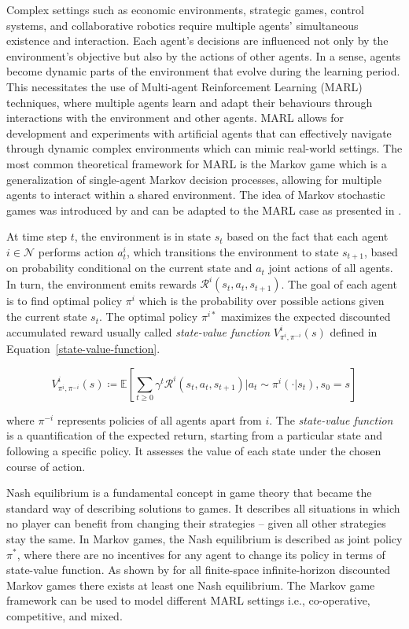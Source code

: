 \documentclass[pdflatex,sn-basic,lineno]{sn-jnl}
\theoremstyle{thmstyleone}%
\theoremstyle{thmstyletwo}%
\theoremstyle{thmstylethree}%
\begin{document}
Complex settings such as economic environments, strategic games, control systems, and collaborative robotics require
multiple agents’ simultaneous existence and interaction. Each agent’s decisions are influenced not only by the
environment’s objective but also by the actions of other agents. In a sense, agents become dynamic parts of the
environment that evolve during the learning period. This necessitates the use of Multi-agent Reinforcement Learning
(MARL) techniques, where multiple agents learn and adapt their behaviours through interactions with the environment and
other agents. MARL allows for development and experiments with artificial agents that can effectively navigate through
dynamic complex environments which can mimic real-world settings. The most common theoretical framework for MARL is the
Markov game which is a generalization of single-agent Markov decision processes, allowing for multiple agents to
interact within a shared environment. The idea of Markov stochastic games was introduced by \cite{Shapley1953} and can
be adapted to the MARL case as presented in \cite{Zhang2021}.


At time step $t$, the environment is in state $s_t$ based on the fact that each agent $i\in\mathcal{N}$ performs action
$a^i_t$, which transitions the environment to state $s_{t+1}$, based on probability conditional on the current state and
$a_t$ joint actions of all agents. In turn, the environment emits rewards $\mathcal{R}^i(s_t,a_t,s_{t+1})$. The goal of
each agent is to find optimal policy $\pi^i$ which is the probability over possible actions given the current state
$s_t$. The optimal policy $\pi^{i*}$ maximizes the expected discounted accumulated reward usually called
\textit{state-value function} $V^i_{\pi^i,\pi^{-i}}(s)$ defined in Equation~\ref{state-value-function}.

\begin{equation}\label{state-value-function}
    V^i_{\pi^i,\pi^{-i}}(s)\coloneqq\mathbb{E}\left[\sum\limits_{t\geq0}\gamma^t\mathcal{R}^i(s_t,a_t,s_{t+1})\bigg| a_t\sim \pi^i(\cdot|s_t),s_0=s\right]
\end{equation}

where $\pi^{-i}$ represents policies of all agents apart from $i$. The \textit{state-value function} is a quantification
of the expected return, starting from a particular state and following a specific policy. It assesses the value of each
state under the chosen course of action.

Nash equilibrium is a fundamental concept in game theory that became the standard way of describing solutions to games.
It describes all situations in which no player can benefit from changing their strategies – given all other strategies
stay the same. In Markov games, the Nash equilibrium is described as joint policy $\pi^*$, where there are no incentives
for any agent to change its policy in terms of state-value function. As shown by \cite{Filar1996} for all finite-space
infinite-horizon discounted Markov games there exists at least one Nash equilibrium. The Markov game framework can be
used to model different MARL settings i.e., co-operative, competitive, and mixed.
\end{document}
